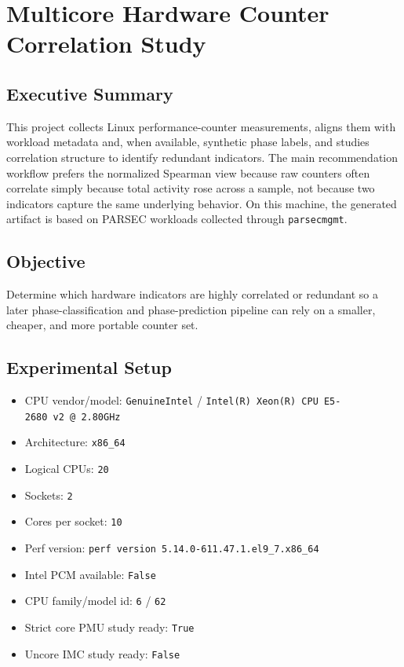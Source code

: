 \documentclass[
]{article}
\author{}
\date{}
\providecommand{\tightlist}{%
  \setlength{\itemsep}{0pt}\setlength{\parskip}{0pt}}
\begin{document}
\hypertarget{multicore-hardware-counter-correlation-study}{%
\section{Multicore Hardware Counter Correlation
Study}\label{multicore-hardware-counter-correlation-study}}

\hypertarget{executive-summary}{%
\subsection{Executive Summary}\label{executive-summary}}

This project collects Linux performance-counter measurements, aligns
them with workload metadata and, when available, synthetic phase labels,
and studies correlation structure to identify redundant indicators. The
main recommendation workflow prefers the normalized Spearman view
because raw counters often correlate simply because total activity rose
across a sample, not because two indicators capture the same underlying
behavior. On this machine, the generated artifact is based on PARSEC
workloads collected through \texttt{parsecmgmt}.

\hypertarget{objective}{%
\subsection{Objective}\label{objective}}

Determine which hardware indicators are highly correlated or redundant
so a later phase-classification and phase-prediction pipeline can rely
on a smaller, cheaper, and more portable counter set.

\hypertarget{experimental-setup}{%
\subsection{Experimental Setup}\label{experimental-setup}}

\begin{itemize}
\tightlist
\item
  CPU vendor/model: \texttt{GenuineIntel} /
  \texttt{Intel(R)\ Xeon(R)\ CPU\ E5-2680\ v2\ @\ 2.80GHz}
\item
  Architecture: \texttt{x86\_64}
\item
  Logical CPUs: \texttt{20}
\item
  Sockets: \texttt{2}
\item
  Cores per socket: \texttt{10}
\item
  Perf version: \texttt{perf\ version\ 5.14.0-611.47.1.el9\_7.x86\_64}
\item
  Intel PCM available: \texttt{False}
\item
  CPU family/model id: \texttt{6} / \texttt{62}
\item
  Strict core PMU study ready: \texttt{True}
\item
  Uncore IMC study ready: \texttt{False}
\end{itemize}
\end{document}
